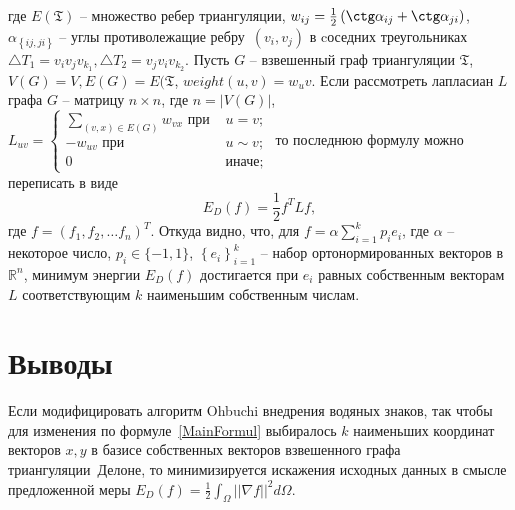 \documentclass{article}
\begin{document}
где $E(\mathfrak{T})$ -- множество ребер триангуляции, $w_{ij} = \frac{1}{2}\left(\ctg\alpha_{ij} + \ctg\alpha_{ji}\right)$, $\alpha_{\left\{{ij, ji}\right\}}$ -- углы противолежащие 
ребру~$(v_i, v_j)$ в cоседних треугольниках $\triangle T_1 = v_i v_j v_{k_1}, \triangle T_2 = v_j v_i v_{k_2}$.
Пусть $G$ -- взвешенный граф триангуляции $\mathfrak{T}$, $V(G) = V, E(G) = E(\mathfrak{T}$, $weight(u, v) = w_uv$. Если рассмотреть лапласиан $L$ графа $G$ -- матрицу $n \times n$, 
где $n = |V(G)|$, $L_{uv} = \begin{cases}
  \sum_{(v, x) \in E(G)}{w_{vx}}\mbox{ при }&\text{$u = v;$} \\
  -w_{uv}\mbox{ при }&\text{$u \sim v;$} \\
  0 &\text{иначе;}
    \end{cases}$ то последнюю формулу можно переписать в виде 
\begin{equation*}
  E_D(f) = \frac{1}{2} f^T L f, 
\end{equation*}
где $f = (f_1, f_2, \dots f_n)^T$. Откуда видно, что, для $f = \alpha \sum_{i=1}^k p_i e_i$, где $\alpha$ -- некоторое число, $p_i \in \{-1, 1 \}$, 
$\left\{e_i\right\}_{i=1}^k$ -- набор ортонормированных векторов в $\mathbb{R}^n$, минимум энергии $E_D(f)$ достигается при $e_i$ равных собственным векторам $L$ 
соответствующим $k$ наименьшим собственным числам.  

\section{Выводы}
Если модифицировать алгоритм Ohbuchi внедрения водяных знаков, так чтобы для изменения по формуле~\ref{MainFormul} выбиралось $k$ наименьших координат векторов $x, y$ в базисе собственных векторов взвешенного графа триангуляции~Делоне, то минимизируется искажения исходных данных в смысле предложенной меры $E_D(f) = \frac{1}{2} \int_{\Omega}{||\nabla f||^2} d\Omega$.
\end{document}
